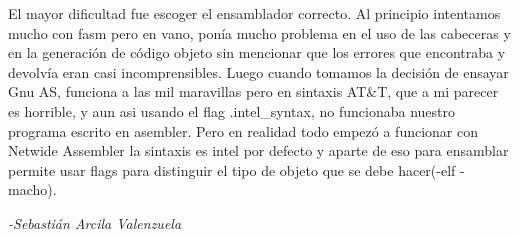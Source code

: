 
El mayor dificultad fue escoger el ensamblador correcto.
Al principio intentamos mucho con fasm pero en vano, ponía mucho problema en el uso de las cabeceras y en la generación de código objeto sin mencionar que los errores que encontraba y devolvía eran casi incomprensibles.
Luego cuando tomamos la decisión de ensayar Gnu AS, funciona a las mil maravillas pero en sintaxis AT\&T, que a mi parecer es horrible, y aun asi usando el flag .intel\_syntax, no funcionaba nuestro programa escrito en asembler.
Pero en realidad todo empezó a funcionar con Netwide Assembler la sintaxis es intel por defecto y aparte de eso para ensamblar permite usar flags para distinguir el tipo de objeto que se debe hacer(-elf -macho). 
\begin{flushright} 
	\itshape{-Sebastián Arcila Valenzuela}
\end{flushright}

